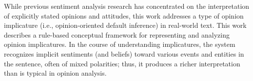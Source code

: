 While previous sentiment analysis research has concentrated on the interpretation of explicitly stated opinions and attitudes, this work addresses a type of opinion implicature (i.e., opinion-oriented default inference) in real-world text. This work describes a rule-based conceptual framework for representing and analyzing opinion implicatures. In the course of understanding implicatures, the system recognizes implicit sentiments (and beliefs) toward various events and entities in the sentence, often of mixed polarities; thus, it produces a richer interpretation than is typical in opinion analysis.
